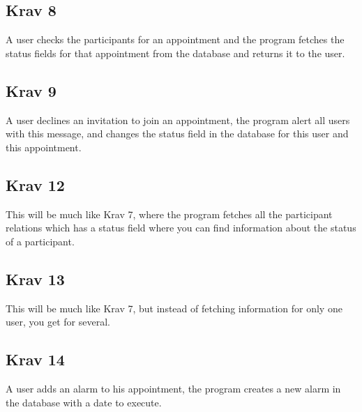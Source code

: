 \documentclass[a4paper, 10pt]{article}
\begin{document}
\subsection*{Krav 8}
A user checks the participants for an appointment and the program fetches the status fields for that appointment from the database and returns it to the user.

\subsection*{Krav 9}
A user declines an invitation to join an appointment, the program alert all users with this message, and changes the status field in the database for this user and this appointment.

\subsection*{Krav 12}
This will be much like Krav 7, where the program fetches all the participant relations which has a status field where you can find information about the status of a participant.

\subsection*{Krav 13}
This will be much like Krav 7, but instead of fetching information for only one user, you get for several.

\subsection*{Krav 14}
A user adds an alarm to his appointment, the program creates a new alarm in the database with a date to execute.
\end{document}
